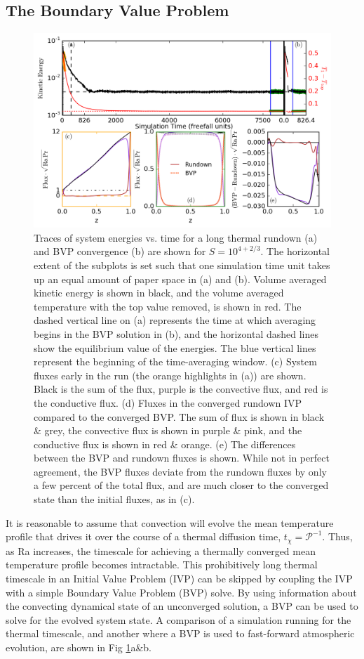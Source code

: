 \documentclass[aps, pre, onecolumn, nofootinbib, notitlepage, groupedaddress, amsfonts, amssymb, amsmath, longbibliography]{revtex4-1}
\begin{document}
\subsection{The Boundary Value Problem}
\begin{figure}[t]
\includegraphics[width=\textwidth]{./figs/time_trace.png}
\caption{Traces of system energies vs. time for a long thermal rundown (a) and BVP convergence
(b) are shown for $S = 10^{4 + 2/3}$.  The horizontal extent of the subplots is set
such that one simulation time unit takes up an equal amount of paper space in (a) and (b). Volume averaged
kinetic energy is shown in black, and the volume averaged temperature with the top value removed, is shown
in red.
The dashed vertical line on (a) represents the time at which averaging begins in the BVP solution in (b),
and the horizontal dashed lines show the equilibrium value of the energies. The blue vertical lines represent
the beginning of the time-averaging window.
(c) System fluxes early in the run (the orange highlights in (a)) are shown.  
Black is the sum of the flux, purple
is the convective flux, and red is the conductive flux.
(d) Fluxes in the converged rundown IVP compared to the converged BVP.  The sum of flux is shown in
black \& grey, the convective flux is shown in purple \& pink, and the conductive flux is shown in red \& orange.
(e) The differences between the BVP and rundown fluxes is shown.  While not in perfect agreement, 
the BVP fluxes deviate from the rundown fluxes by only a few percent of the total flux, and
are much closer to the converged state than the initial fluxes, as in (c).
\label{fig:time_trace} }
\end{figure}

It is reasonable to assume that convection will evolve the mean temperature profile that
drives it over the course of a thermal diffusion time, $t_\chi = \mathcal{P}^{-1}$. Thus, as Ra
increases, the timescale for achieving a thermally converged mean temperature profile becomes intractable.
This prohibitively long thermal timescale in an Initial Value Problem (IVP)
can be skipped by coupling the IVP with a simple Boundary Value Problem
(BVP) solve. By using information about the convecting dynamical state of an unconverged solution,
a BVP can be used to solve for the evolved system state.
A comparison of a simulation running for the thermal timescale, and another where a BVP is used
to fast-forward atmospheric evolution, are shown in Fig \ref{fig:time_trace}a\&b.
\end{document}
